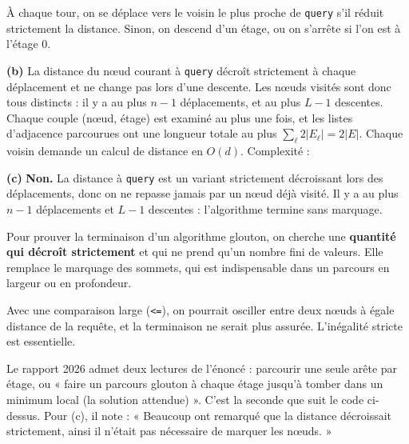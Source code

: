 \documentclass[11pt,a4paper]{article}
\newcommand{\equationajustee}[1]{%
  \sbox{\boiteequation}{$\displaystyle #1$}%
  \ifdim\wd\boiteequation>\linewidth
    \[\resizebox{\linewidth}{!}{\usebox{\boiteequation}}\]%
  \else
    \[#1\]%
  \fi}
\begin{document}
À chaque tour, on se déplace vers le voisin le plus proche de \texttt{query} s'il réduit strictement la distance. Sinon, on descend d'un étage, ou on s'arrête si l'on est à l'étage 0.

\textbf{(b)} La distance du nœud courant à \texttt{query} décroît strictement à chaque déplacement et ne change pas lors d'une descente. Les nœuds visités sont donc tous distincts : il y a au plus \(n-1\) déplacements, et au plus \(L-1\) descentes. Chaque couple (nœud, étage) est examiné au plus une fois, et les listes d'adjacence parcourues ont une longueur totale au plus \(\sum_\ell2|E_\ell|=2|E|\). Chaque voisin demande un calcul de distance en \(O(d)\). Complexité :

\equationajustee{\boxed{O\big(d\,(|E|+1)+n+L\big)}.}

\textbf{(c)} \textbf{Non.} La distance à \texttt{query} est un variant strictement décroissant lors des déplacements, donc on ne repasse jamais par un nœud déjà visité. Il y a au plus \(n-1\) déplacements et \(L-1\) descentes : l'algorithme termine sans marquage.

\begin{methode}

Pour prouver la terminaison d'un algorithme glouton, on cherche une \textbf{quantité qui décroît strictement} et qui ne prend qu'un nombre fini de valeurs. Elle remplace le marquage des sommets, qui est indispensable dans un parcours en largeur ou en profondeur.

\end{methode}

\begin{piege}

Avec une comparaison large (\texttt{\textless{}=}), on pourrait osciller entre deux nœuds à égale distance de la requête, et la terminaison ne serait plus assurée. L'inégalité stricte est essentielle.

\end{piege}

\begin{jury}

Le rapport 2026 admet deux lectures de l'énoncé : parcourir une seule arête par étage, ou « faire un parcours glouton à chaque étage jusqu'à tomber dans un minimum local (la solution attendue) ». C'est la seconde que suit le code ci-dessus. Pour (c), il note : « Beaucoup ont remarqué que la distance décroissait strictement, ainsi il n'était pas nécessaire de marquer les nœuds. »

\end{jury}
\end{document}
